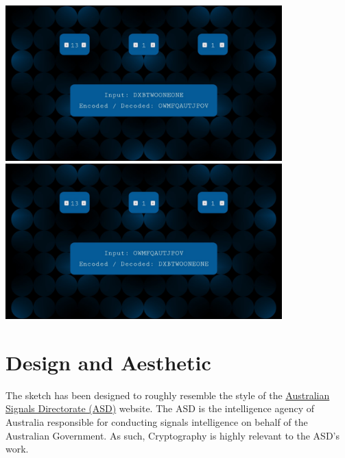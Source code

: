 \documentclass[12pt,a4paper]{article}
\begin{document}
		\begin{center}
			\includegraphics[width=0.8\textwidth]{figures/figure1.jpg}\\
			\vspace{0.5cm}
			\includegraphics[width=0.8\textwidth]{figures/figure2.jpg}\\
		\end{center}
	
	\newpage

	\section{Design and Aesthetic}
		The sketch has been designed to roughly resemble the style of the 
		\href{https://www.asd.gov.au/}{Australian Signals Directorate (ASD)} website. 
		The ASD is the intelligence agency of Australia responsible for conducting 
		signals intelligence on behalf of the Australian Government. As such, 
		Cryptography is highly relevant to the ASD's work.\\
		
		\begin{center}
			\par
		\end{center}
\end{document}
